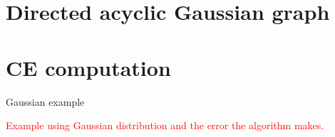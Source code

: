 \documentclass[../Thesis.tex]{subfiles}
\begin{document}
\newpage
\section{Directed acyclic Gaussian graph}\label{sec:General Gaussian graph}









\section{CE computation}\label{sec:gaussian MI error}
Gaussian example

\textcolor{red}{Example using Gaussian distribution and the error the algorithm makes.}
\end{document}
